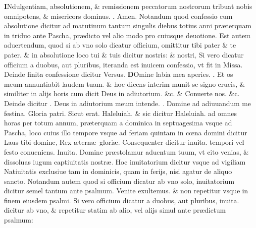 \documentclass[a5paper,10pt]{book}
\makeatletter
\DeclareRobustCommand{\Vbar}{\vers@resp{-0.1em}{V}}
\DeclareRobustCommand{\Rbar}{\vers@resp{0pt}{R}}
\newcommand{\vers@resp@sym}{\raisebox{0.2ex}{\rotatebox[origin=c]{-20}{$\m@th\rceil$}}}
\newcommand{\vers@resp}[2]{%
  {\ooalign{\hidewidth\kern#1\vers@resp@sym\hidewidth\cr#2\cr}}%
}%
\def\ae{æ}
\def\oe{œ}
\makeatother
\begin{document}
\begin{multicols*}{2}
\lettrine[lines=2]{\bfseries \color{red} I}{}Ndulgentiam, absolutionem, \& remissionem peccatorum nostrorum tribuat nobis omnipotens, \& misericors dominus. \color{red} \Rbar . \color{black} Amen.
\newline {} \color{red} Notandum quod confessio cum absolutione dicitur ad matutinum tantum singulis diebus totius anni pr\ae terquam in triduo ante Pascha, pr\ae dicto vel alio modo pro cuiusque deuotione.
Est autem aduertendum, quod si ab vno solo dicatur officium, omittitur \color{black} tibi pater \color{red} \& \color{black} te pater. \color{red} \& in absolutione loco \color{black} tui \color{red} \& \color{black} tuis \color{red} dicitur \color{black} nostris: \color{red} \& \color{black} nostri, \color{red} Si vero dicatur officium a duobus, aut pluribus, iteranda %
est inuicem confessio, vt fit in Missa. \color{black}
\newline {} \color{red} Deinde finita confessione dicitur Versus. \color{black}
\lettrine[lines=2]{\bfseries \color{red} D}{}Omine labia mea aperies. \color{red} \Rbar . \color{black} Et os meum annuntiabit laudem tuam.
\color{red} \& hoc dicens interim munit se signo crucis, \& similiter in alijs horis cum dicit \color{black} Deus in adiutorium. \color{red} \&c. \& \color{black} Conuerte nos. \color{red} \&c. \color{black}
\newline {} \color{red} Deinde dicitur \Vbar . \color{black} Deus in adiutorium meum intende. \color{red} \Rbar . \color{black} Domine ad adiuuandum me festina. Gloria patri. Sicut erat. Haleluiah. \color{red} \& sic dicitur \color{black} Haleluiah. \color{red} ad omnes horas per totum annum, pr\ae terquam a dominica in septuagesima vsque ad Pascha, loco cuius illo tempore vsque ad feriam quintam in c\oe na domini dicitur \color{black} Laus tibi domine, Rex \ae tern\ae \ glori\ae . \color{red} Consequenter dicitur inuita. tempori vel festo conueniens. Inuita. \color{black} Domine pr\ae stolamur aduentum tuum, vt cito venias, \& dissoluas iugum captiuitatis nostr\ae .
\newline {} \color{red} Hoc inuitatorium dicitur vsque ad vigiliam Natiuitatis exclusiue tam in dominicis, quam in ferijs, nisi agatur de aliquo sancto.\color{black}
\newline {} \color{red} Notandum autem quod si officium dicatur ab vno solo, inuitatorium dicitur semel tantum ante psalmum. \color{black} Venite exultemus. \color{red} \& non repetitur vsque in finem eiusdem psalmi. Si vero officium dicatur a duobus, aut pluribus, inuita. dicitur ab vno, \& repetitur statim ab alio, vel alijs simul ante pr\ae dictum psalmum: 

\end{multicols*}
\end{document}
